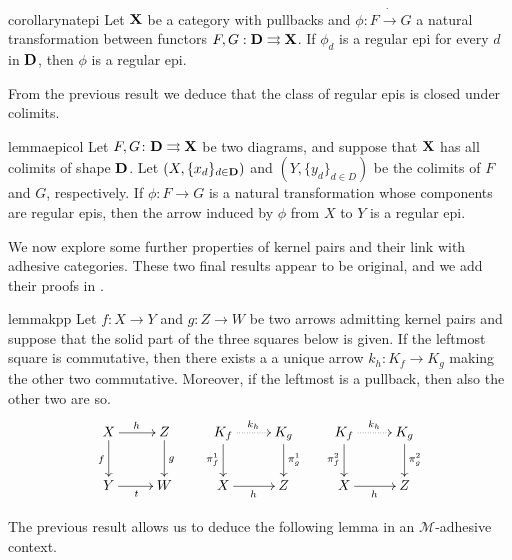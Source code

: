 \documentclass[a4paper,UKenglish,cleveref,pdftex,thm-restate,numberwithinsect]{lipics-v2021}
\def\D{\textbf {\textup{D}}}
\def\X{\textbf {\textup{X}}}
\begin{document}
\begin{restatable}{corollary}{natepi}\label{cor:reg_epi_components_reg_epi_nat_trans}
    Let $\X$ be a category with pullbacks and $\phi\colon F \dot\to G$ a natural transformation between functors $F, G: \D \rightrightarrows \X$. If $\phi_d$ is a regular epi for every $d$ in $\D$, then $\phi$ is a regular epi.
\end{restatable}

From the previous result we deduce that the class of regular epis is closed under colimits.

\begin{restatable}{lemma}{epicol}\label{lemma:nat_trans_reg_epi_canonical_arrow_reg_epi}
    Let $F,G\colon \D\rightrightarrows \X$ be two diagrams, and suppose that $\X$ has all colimits of shape $\D$. Let $(X, \{x_d\}_{d \in \D})$ and $(Y, \{y_d\}_{d\in D})$ be the colimits of $F$ and $G$, respectively.  If $\phi\colon  F \to G$ is a natural transformation whose components are regular epis, then the arrow induced by $\phi$ from $X$ to $Y$ is a regular epi.
\end{restatable}

We now explore some further properties of kernel pairs and their link with adhesive categories. 
These two final results appear to be original, and we add their proofs in .

\begin{restatable}{lemma}{kpp}\label{lemma:kern_pairs_pres_pullbacks}
	Let $f\colon X \to Y$ and $g\colon Z \to W$ be two arrows admitting kernel pairs and suppose that the solid part of the three squares below is given. 
	If the leftmost square is commutative, then there exists a a unique arrow $k_h: K_f \to K_g$ making the other two commutative.
	Moreover, if the leftmost is a pullback, then also the other two are so.
%
	\[\xymatrix{X \ar[r]^{h}\ar[d]_{f}& Z \ar[d]^{g} & K_f \ar@{.>}[r]^{k_h} \ar[d]_{\pi^1_f}& K_g \ar[d]^{\pi^1_g} & K_f  \ar@{.>}[r]^{k_h} \ar[d]_{\pi^2_f}& K_g \ar[d]^{\pi^2_g}\\ Y \ar[r]_t& W & X \ar[r]_{h} & Z & X\ar[r]_{h} &Z}\]
	
\end{restatable}

The previous result allows us to deduce the following lemma in an $\mathcal{M}$-adhesive context.
\end{document}
